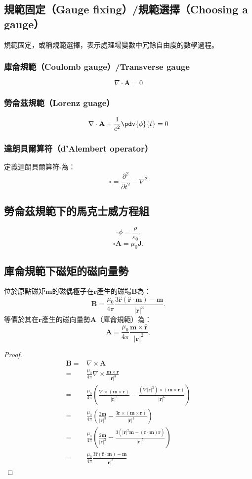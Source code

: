 \documentclass[a4paper,12pt]{report}
\begin{document}
\begin{itemize}
\subsection{規範固定（Gauge fixing）/規範選擇（Choosing a gauge）}
規範固定，或稱規範選擇，表示處理場變數中冗餘自由度的數學過程。
\subsubsection{庫侖規範（Coulomb gauge）/Transverse gauge}
\[ \nabla \cdot \mathbf{A} = 0\]
\subsubsection{勞侖茲規範（Lorenz guage）}
\[\nabla \cdot \mathbf{A} + \frac{1}{c^2} \pdv{\phi}{t} = 0\]
\subsubsection{達朗貝爾算符（d'Alembert operator）}
定義達朗貝爾算符$\square$為：
\[\square = \frac{\partial^2}{\partial t^2} - \nabla^2\]
\subsection{勞侖茲規範下的馬克士威方程組}
\[\square \phi = \frac{\rho}{\varepsilon_0}.\]
\[\square \mathbf{A} = \mu_0 \mathbf{J}.\]
\subsection{庫侖規範下磁矩的磁向量勢}
位於原點磁矩$\mathbf{m}$的磁偶極子在$\mathbf{r}$產生的磁場$\mathbf{B}$為：
\[\mathbf{B}=\frac{\mu_0}{4\pi}\frac{3\hat{\mathbf{r}}\left(\hat{\mathbf{r}}\cdot\mathbf{m}\right)-\mathbf{m}}{|\mathbf{r}|^3}.\]
等價於其在$\mathbf{r}$產生的磁向量勢$\mathbf{A}$（庫侖規範）為：
\[\mathbf{A} = \frac{\mu_0}{4\pi} \frac{\mathbf{m} \times \hat{\mathbf{r}}}{|\mathbf{r}|^2},\]
\begin{proof}
\[\begin{aligned}
\mathbf{B}=&\nabla\times\mathbf{A}\\
=&\frac{\mu_0}{4\pi}\nabla\times\frac{\mathbf{m}\times\mathbf{r}}{|\mathbf{r}|^3}\\
=&\frac{\mu_0}{4\pi}\left(\frac{\nabla\times(\mathbf{m}\times\mathbf{r})}{|\mathbf{r}|^3}-\frac{(\nabla|\mathbf{r}|^3)\times(\mathbf{m}\times\mathbf{r})}{|\mathbf{r}|^6}\right)\\
=&\frac{\mu_0}{4\pi}\left(\frac{2\mathbf{m}}{|\mathbf{r}|^3}-\frac{3\mathbf{r}\times(\mathbf{m}\times\mathbf{r})}{|\mathbf{r}|^5}\right)\\
=&\frac{\mu_0}{4\pi}\left(\frac{2\mathbf{m}}{|\mathbf{r}|^3}-\frac{3\left(|\mathbf{r}|^2\mathbf{m}-(\mathbf{r}\cdot\mathbf{m})\mathbf{r}\right)}{|\mathbf{r}|^5}\right)\\
=&\frac{\mu_0}{4\pi}\frac{3\hat{\mathbf{r}}\left(\hat{\mathbf{r}}\cdot\mathbf{m}\right)-\mathbf{m}}{|\mathbf{r}|^3}
\end{aligned}\]
\end{proof}

\end{itemize}
\end{document}
